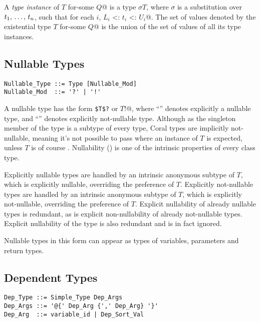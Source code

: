 A {\em type instance} of \lstinline@$T$ for-some {$Q$}@ is a type $\sigma T$, where $\sigma$ is a substitution over $t_1 ,\, \ldots ,\, t_n$, such that for each $i$, \lstinline@$L_i$ <: $t_i$ <: $U_i$@. The set of values denoted by the existential type \lstinline@$T$ for-some {$Q$}@ is the union of the set of values of all its type instances. 

\subsection{Nullable Types}
\label{sec:nullable-types}

\syntax\begin{lstlisting}
Nullable_Type ::= Type [Nullable_Mod]
Nullable_Mod  ::= '?' | '!'
\end{lstlisting}

A nullable type has the form \lstinline!$T$?! or \lstinline@$T$!@, where ``'' denotes explicitly a nullable type, and ``\code{!}'' denotes explicitly not-nullable type. Although  as the singleton member of the  type is a subtype of every type, Coral types are implicitly not-nullable, meaning it's not possible to pass  where an instance of $T$ is expected, unless $T$ is of course . Nullability () is one of the intrinsic properties of every class type. 

Explicitly nullable types are handled by an intrinsic anonymous subtype of $T$, which is explicitly nullable, overriding the preference of $T$. Explicitly not-nullable types are handled by an intrinsic anonymous subtype of $T$, which is explicitly not-nullable, overriding the preference of $T$. Explicit nullability of already nullable types is redundant, as is explicit non-nullability of already not-nullable types. Explicit nullability of the  type is also redundant and is in fact ignored. 

Nullable types in this form can appear as types of variables, parameters and return types. 

\subsection{Dependent Types}
\label{sec:dependent-types}

\syntax\begin{lstlisting}
Dep_Type ::= Simple_Type Dep_Args
Dep_Args ::= '@{' Dep_Arg {',' Dep_Arg} '}'
Dep_Arg  ::= variable_id | Dep_Sort_Val
\end{lstlisting}

